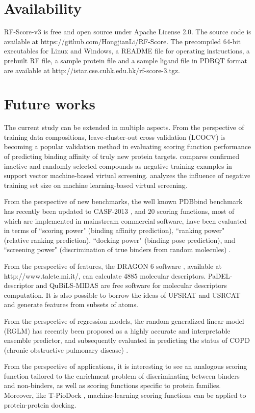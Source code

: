 \section{Availability}

RF-Score-v3 is free and open source under Apache License 2.0. The source code is available at https://github.com/HongjianLi/RF-Score. The precompiled 64-bit executables for Linux and Windows, a README file for operating instructions, a prebuilt RF file, a sample protein file and a sample ligand file in PDBQT format are available at http://istar.cse.cuhk.edu.hk/rf-score-3.tgz.

\section{Future works}

The current study can be extended in multiple aspects. From the perspective of training data compositions, leave-cluster-out cross validation (LCOCV) \citep{774} is becoming a popular validation method in evaluating scoring function performance of predicting binding affinity of truly new protein targets. \citep{1423} compares confirmed inactive and randomly selected compounds as negative training examples in support vector machine-based virtual screening. \citep{1404} analyzes the influence of negative training set size on machine learning-based virtual screening.

From the perspective of new benchmarks, the well known PDBbind benchmark has recently been updated to CASF-2013 \citep{1426}, and 20 scoring functions, most of which are implemented in mainstream commercial software, have been evaluated in terms of ``scoring power" (binding affinity prediction), ``ranking power" (relative ranking prediction), ``docking power" (binding pose prediction), and ``screening power" (discrimination of true binders from random molecules) \citep{1411}.

From the perspective of features, the DRAGON 6 software \citep{1478}, available at http://www.talete.mi.it/, can calculate 4885 molecular descriptors. PaDEL-descriptor \citep{1479} and QuBiLS-MIDAS \citep{1400} are free software for molecular
descriptors computation. It is also possible to borrow the ideas of UFSRAT \citep{1436} and USRCAT \citep{1331} and generate features from subsets of atoms.

From the perspective of regression models, the random generalized linear model (RGLM) has recently been proposed \citep{1377} as a highly accurate and interpretable ensemble predictor, and subsequently evaluated in predicting the status of COPD (chronic
obstructive pulmonary disease) \citep{1418}.

From the perspective of applications, it is interesting to see an analogous scoring function tailored to the enrichment problem of discriminating between binders and non-binders, as well as scoring functions specific to protein families. Moreover, like T-PioDock \citep{1399}, machine-learning scoring functions can be applied to protein-protein docking.

\chapterend

